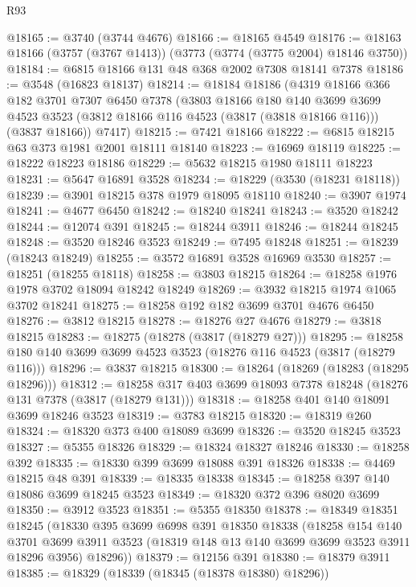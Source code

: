 \begin{lexlean}{R93}
\begin{coremodule}
@18165 := @3740 (@3744 @4676)
@18166 := @18165 @4549
@18176 := @18163 @18166 (@3757 (@3767 @1413)) (@3773 (@3774 (@3775 @2004) @18146 @3750))
@18184 := @6815 @18166 @131 @48 @368 @2002 @7308 @18141 @7378
@18186 := @3548 (@16823 @18137)
@18214 := @18184
    @18186
    (@4319
      @18166
      @366
      @182
      @3701
      @7307
      @6450
      @7378
      (@3803
        @18166
        @180
        @140
        @3699
        @3699
        @4523
        @3523
        (@3812 @18166 @116 @4523 (@3817 (@3818 @18166 @116)))
        (@3837 @18166))
      @7417)
@18215 := @7421 @18166
@18222 := @6815 @18215 @63 @373 @1981 @2001 @18111 @18140
@18223 := @16969 @18119
@18225 := @18222 @18223 @18186
@18229 := @5632 @18215 @1980 @18111 @18223
@18231 := @5647 @16891 @3528
@18234 := @18229 (@3530 (@18231 @18118))
@18239 := @3901 @18215 @378 @1979 @18095 @18110
@18240 := @3907 @1974
@18241 := @4677 @6450
@18242 := @18240 @18241
@18243 := @3520 @18242
@18244 := @12074 @391
@18245 := @18244 @3911
@18246 := @18244 @18245
@18248 := @3520 @18246 @3523
@18249 := @7495 @18248
@18251 := @18239 (@18243 @18249)
@18255 := @3572 @16891 @3528 @16969 @3530
@18257 := @18251 (@18255 @18118)
@18258 := @3803 @18215
@18264 := @18258 @1976 @1978 @3702 @18094 @18242 @18249
@18269 := @3932 @18215 @1974 @1065 @3702 @18241
@18275 := @18258 @192 @182 @3699 @3701 @4676 @6450
@18276 := @3812 @18215
@18278 := @18276 @27 @4676
@18279 := @3818 @18215
@18283 := @18275 (@18278 (@3817 (@18279 @27)))
@18295 := @18258 @180 @140 @3699 @3699 @4523 @3523 (@18276 @116 @4523 (@3817 (@18279 @116)))
@18296 := @3837 @18215
@18300 := @18264 (@18269 (@18283 (@18295 @18296)))
@18312 := @18258 @317 @403 @3699 @18093 @7378 @18248 (@18276 @131 @7378 (@3817 (@18279 @131)))
@18318 := @18258 @401 @140 @18091 @3699 @18246 @3523
@18319 := @3783 @18215
@18320 := @18319 @260
@18324 := @18320 @373 @400 @18089 @3699
@18326 := @3520 @18245 @3523
@18327 := @5355 @18326
@18329 := @18324 @18327 @18246
@18330 := @18258 @392
@18335 := @18330 @399 @3699 @18088 @391 @18326
@18338 := @4469 @18215 @48 @391
@18339 := @18335 @18338
@18345 := @18258 @397 @140 @18086 @3699 @18245 @3523
@18349 := @18320 @372 @396 @8020 @3699
@18350 := @3912 @3523
@18351 := @5355 @18350
@18378 := @18349
    @18351
    @18245
    (@18330
      @395
      @3699
      @6998
      @391
      @18350
      @18338
      (@18258
        @154
        @140
        @3701
        @3699
        @3911
        @3523
        (@18319 @148 @13 @140 @3699 @3699 @3523 @3911 @18296 @3956)
        @18296))
@18379 := @12156 @391
@18380 := @18379 @3911
@18385 := @18329 (@18339 (@18345 (@18378 @18380) @18296))

\end{coremodule}
\end{lexlean}
